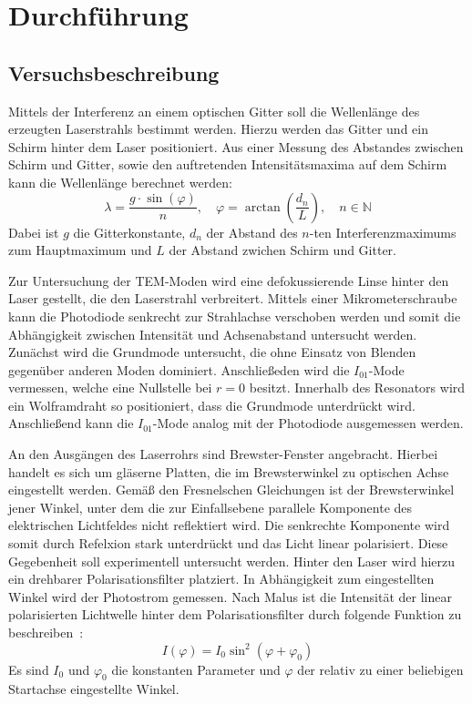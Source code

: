 \section{Durchführung}
\label{sec:Durchführung}



\subsection{Versuchsbeschreibung}
\label{sec:Versuchsbeschreibung}
Mittels der Interferenz an einem optischen Gitter soll die Wellenlänge des erzeugten Laserstrahls bestimmt werden. Hierzu werden das Gitter
und ein Schirm hinter dem Laser positioniert. Aus einer Messung des Abstandes zwischen Schirm und Gitter, sowie den auftretenden Intensitätsmaxima
auf dem Schirm kann die Wellenlänge berechnet werden:
\begin{equation}
	  \lambda = \frac{g \cdot \sin(\varphi)}{n}, \quad \varphi = \arctan\left(\frac{d_n}{L} \right) ,\quad n \in \mathbb{N}
	    \label{eq:interferenz}
\end{equation}
Dabei ist $g$ die Gitterkonstante, $d_n$ der Abstand des $n$-ten Interferenzmaximums zum Hauptmaximum und $L$ der Abstand zwichen Schirm und Gitter.

Zur Untersuchung der TEM-Moden wird eine defokussierende Linse hinter den Laser gestellt, die den Laserstrahl verbreitert.
Mittels einer Mikrometerschraube kann die Photodiode
senkrecht zur Strahlachse verschoben werden und somit die Abhängigkeit zwischen Intensität und Achsenabstand untersucht werden. Zunächst
wird die Grundmode untersucht, die ohne Einsatz von Blenden gegenüber anderen Moden dominiert. Anschließeden wird die $I_{01}$-Mode
vermessen, welche eine Nullstelle bei $r = 0$ besitzt. Innerhalb des Resonators wird ein Wolframdraht so positioniert, dass die Grundmode
unterdrückt wird. Anschließend kann die $I_{01}$-Mode analog mit der Photodiode ausgemessen werden.

An den Ausgängen des Laserrohrs sind Brewster-Fenster angebracht. Hierbei handelt es sich um gläserne Platten, die
im Brewsterwinkel zu optischen Achse eingestellt werden. Gemäß den Fresnelschen Gleichungen ist der Brewsterwinkel jener Winkel, unter dem
die zur Einfallsebene parallele Komponente des elektrischen Lichtfeldes nicht reflektiert wird. Die senkrechte Komponente wird somit
durch Refelxion stark unterdrückt und das Licht linear polarisiert. Diese Gegebenheit soll
experimentell untersucht werden. Hinter den Laser wird hierzu ein drehbarer Polarisationsfilter platziert. In Abhängigkeit zum eingestellten Winkel
wird der Photostrom gemessen. Nach Malus ist die Intensität der linear polarisierten Lichtwelle hinter dem Polarisationsfilter
durch folgende Funktion zu beschreiben~\cite{malus}:
\begin{equation}
	  I(\varphi) = I_{0} \sin^2\left(\varphi + \varphi_0\right)
	    \label{eq:malus}
\end{equation}
Es sind $I_{0}$ und $\varphi_0$ die konstanten Parameter und $\varphi$ der relativ zu einer beliebigen Startachse eingestellte Winkel.

